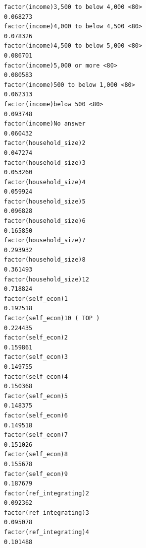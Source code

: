 \documentclass[
]{article}
\begin{document}
\begin{table}
\begin{minipage}[t]{\linewidth}
{\begin{verbatim}
factor(income)3,500 to below 4,000 <80>                                             0.068273
factor(income)4,000 to below 4,500 <80>                                             0.078326
factor(income)4,500 to below 5,000 <80>                                             0.086701
factor(income)5,000 or more <80>                                                    0.080583
factor(income)500 to below 1,000 <80>                                               0.062313
factor(income)below 500 <80>                                                        0.093748
factor(income)No answer                                                             0.060432
factor(household_size)2                                                             0.047274
factor(household_size)3                                                             0.053260
factor(household_size)4                                                             0.059924
factor(household_size)5                                                             0.096828
factor(household_size)6                                                             0.165850
factor(household_size)7                                                             0.293932
factor(household_size)8                                                             0.361493
factor(household_size)12                                                            0.718824
factor(self_econ)1                                                                  0.192518
factor(self_econ)10 ( TOP )                                                         0.224435
factor(self_econ)2                                                                  0.159861
factor(self_econ)3                                                                  0.149755
factor(self_econ)4                                                                  0.150368
factor(self_econ)5                                                                  0.148375
factor(self_econ)6                                                                  0.149518
factor(self_econ)7                                                                  0.151026
factor(self_econ)8                                                                  0.155678
factor(self_econ)9                                                                  0.187679
factor(ref_integrating)2                                                            0.092362
factor(ref_integrating)3                                                            0.095078
factor(ref_integrating)4                                                            0.101488

\end{verbatim}}
\end{minipage}
\end{table}
\end{document}
